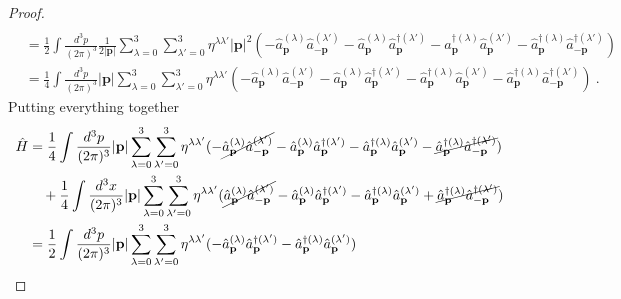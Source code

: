 \begin{proof}
\begin{equation*}
\begin{aligned}
        \end{aligned}
        \end{equation*}
        \begin{equation*}
        \begin{aligned}
            & = \frac{1}{2} \int \frac{d^3 p}{(2\pi)^3} \frac{1}{2 |\mathbf p|} \sum_{\lambda=0}^{3} \sum_{\lambda'=0}^{3} \eta^{\lambda \lambda'} |\mathbf p|^2 (- \hat a_{\mathbf p}^{(\lambda)} \hat a_{- \mathbf p}^{(\lambda')} - \hat a_{\mathbf p}^{(\lambda)} \hat a_{\mathbf p}^{\dagger (\lambda')} - \hat a_{\mathbf p}^{\dagger (\lambda)} \hat a_{\mathbf p}^{(\lambda')} - \hat a_{\mathbf p}^{\dagger (\lambda)} \hat a_{-\mathbf p}^{\dagger (\lambda')} ) \\ & = \frac{1}{4} \int \frac{d^3 p}{(2\pi)^3} |\mathbf p| \sum_{\lambda=0}^{3} \sum_{\lambda'=0}^{3} \eta^{\lambda \lambda'} (- \hat a_{\mathbf p}^{(\lambda)} \hat a_{- \mathbf p}^{(\lambda')} - \hat a_{\mathbf p}^{(\lambda)} \hat a_{\mathbf p}^{\dagger (\lambda')} - \hat a_{\mathbf p}^{\dagger (\lambda)} \hat a_{\mathbf p}^{(\lambda')} - \hat a_{\mathbf p}^{\dagger (\lambda)} \hat a_{-\mathbf p}^{\dagger (\lambda')} ) ~.
        \end{aligned}
        \end{equation*}
        Putting everything together 
        \begin{equation*}
        \begin{aligned}
            \hat H & = \frac{1}{4} \int \frac{d^3 p}{(2\pi)^3} |\mathbf p| \sum_{\lambda=0}^{3} \sum_{\lambda'=0}^{3} \eta^{\lambda \lambda'} (- \cancel{\hat a_{\mathbf p}^{(\lambda)} \hat a_{- \mathbf p}^{(\lambda')}} - \hat a_{\mathbf p}^{(\lambda)} \hat a_{\mathbf p}^{\dagger (\lambda')} - \hat a_{\mathbf p}^{\dagger (\lambda)} \hat a_{\mathbf p}^{(\lambda')} - \cancel{\hat a_{\mathbf p}^{\dagger (\lambda)} \hat a_{-\mathbf p}^{\dagger (\lambda')}} ) \\ & \quad + \frac{1}{4} \int \frac{d^3 x}{(2\pi)^3} |\mathbf p| \sum_{\lambda=0}^{3} \sum_{\lambda'=0}^{3} \eta^{\lambda \lambda'} ( \cancel{\hat a_{\mathbf p}^{(\lambda)} \hat a_{- \mathbf p}^{(\lambda')}}  - \hat a_{\mathbf p}^{(\lambda)} \hat a_{\mathbf p}^{\dagger (\lambda')}  - \hat a_{\mathbf p}^{\dagger (\lambda)} \hat a_{\mathbf p}^{(\lambda')} + \cancel{\hat a_{\mathbf p}^{\dagger (\lambda)} \hat a_{- \mathbf p}^{\dagger (\lambda')}} ) \\ & = \frac{1}{2} \int \frac{d^3 p}{(2\pi)^3} |\mathbf p| \sum_{\lambda=0}^{3} \sum_{\lambda'=0}^{3} \eta^{\lambda \lambda'} (- \hat a_{\mathbf p}^{(\lambda)} \hat a_{\mathbf p}^{\dagger (\lambda')} - \hat a_{\mathbf p}^{\dagger (\lambda)} \hat a_{\mathbf p}^{(\lambda')})

\end{aligned}
\end{equation*}
\end{proof}
